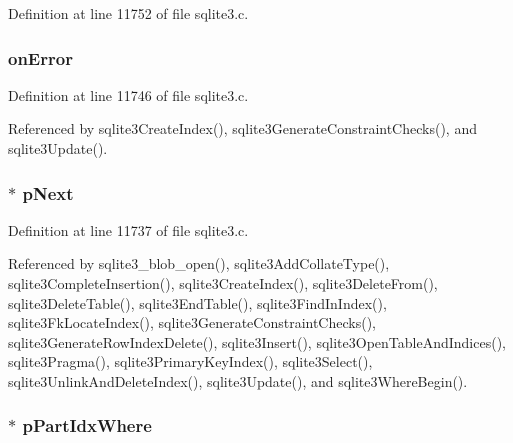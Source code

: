 Definition at line 11752 of file sqlite3.\+c.

\hypertarget{struct_index_acae3cdb7acfb920686612099f16c0ff4}{}
\subsubsection[{on\+Error}]{ on\+Error}\label{struct_index_acae3cdb7acfb920686612099f16c0ff4}


Definition at line 11746 of file sqlite3.\+c.



Referenced by sqlite3\+Create\+Index(), sqlite3\+Generate\+Constraint\+Checks(), and sqlite3\+Update().

\hypertarget{struct_index_a66a59da0320c08c1411d1fff7b44d5dd}{}
\subsubsection[{p\+Next}]{$\ast$ p\+Next}\label{struct_index_a66a59da0320c08c1411d1fff7b44d5dd}


Definition at line 11737 of file sqlite3.\+c.



Referenced by sqlite3\+\_\+blob\+\_\+open(), sqlite3\+Add\+Collate\+Type(), sqlite3\+Complete\+Insertion(), sqlite3\+Create\+Index(), sqlite3\+Delete\+From(), sqlite3\+Delete\+Table(), sqlite3\+End\+Table(), sqlite3\+Find\+In\+Index(), sqlite3\+Fk\+Locate\+Index(), sqlite3\+Generate\+Constraint\+Checks(), sqlite3\+Generate\+Row\+Index\+Delete(), sqlite3\+Insert(), sqlite3\+Open\+Table\+And\+Indices(), sqlite3\+Pragma(), sqlite3\+Primary\+Key\+Index(), sqlite3\+Select(), sqlite3\+Unlink\+And\+Delete\+Index(), sqlite3\+Update(), and sqlite3\+Where\+Begin().

\hypertarget{struct_index_a5636262a85d6a3220d90d1c7da28e77b}{}
\subsubsection[{p\+Part\+Idx\+Where}]{$\ast$ p\+Part\+Idx\+Where}\label{struct_index_a5636262a85d6a3220d90d1c7da28e77b}


